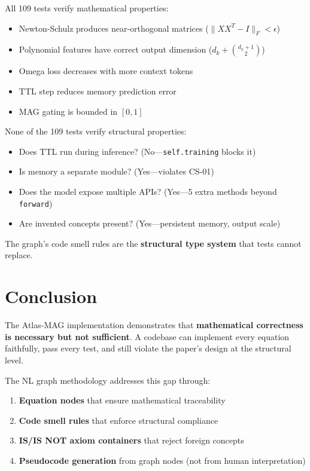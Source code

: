 \documentclass[11pt,letterpaper]{article}
\begin{document}
\noindent All 109 tests verify mathematical properties:
\begin{itemize}[nosep]
  \item Newton-Schulz produces near-orthogonal matrices ($\|XX^T - I\|_F < \epsilon$)
  \item Polynomial features have correct output dimension ($d_k + \binom{d_k+1}{2}$)
  \item Omega loss decreases with more context tokens
  \item TTL step reduces memory prediction error
  \item MAG gating is bounded in $[0,1]$
\end{itemize}

\noindent None of the 109 tests verify structural properties:
\begin{itemize}[nosep]
  \item Does TTL run during inference? (No---\texttt{self.training} blocks it)
  \item Is memory a separate module? (Yes---violates CS-01)
  \item Does the model expose multiple APIs? (Yes---5 extra methods beyond \texttt{forward})
  \item Are invented concepts present? (Yes---persistent memory, output scale)
\end{itemize}

\noindent The graph's code smell rules are the \textbf{structural type system}
that tests cannot replace.

\section{Conclusion}

The Atlas-MAG implementation demonstrates that \textbf{mathematical correctness
is necessary but not sufficient}. A codebase can implement every equation
faithfully, pass every test, and still violate the paper's design at the
structural level.

The NL graph methodology addresses this gap through:
\begin{enumerate}[nosep]
  \item \textbf{Equation nodes} that ensure mathematical traceability
  \item \textbf{Code smell rules} that enforce structural compliance
  \item \textbf{IS/IS NOT axiom containers} that reject foreign concepts
  \item \textbf{Pseudocode generation} from graph nodes (not from human interpretation)
\end{enumerate}
\end{document}
